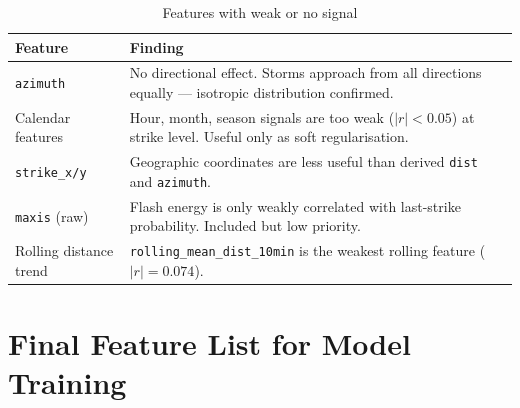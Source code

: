 \documentclass[12pt,a4paper]{article}
\begin{document}
\begin{table}[H]
\centering
\caption{Features with weak or no signal}
\begin{tabular}{lp{9cm}}
\toprule
\textbf{Feature} & \textbf{Finding} \\
\midrule
\texttt{azimuth}           & No directional effect. Storms approach from all directions
                             equally — isotropic distribution confirmed. \\
Calendar features          & Hour, month, season signals are too weak ($|r| < 0.05$)
                             at strike level. Useful only as soft regularisation. \\
\texttt{strike\_x/y}       & Geographic coordinates are less useful than derived
                             \texttt{dist} and \texttt{azimuth}. \\
\texttt{maxis} (raw)       & Flash energy is only weakly correlated with last-strike
                             probability. Included but low priority. \\
Rolling distance trend     & \texttt{rolling\_mean\_dist\_10min} is the weakest
                             rolling feature ($|r|=0.074$). \\
\bottomrule
\end{tabular}
\end{table}

\section{Final Feature List for Model Training}
\end{document}
